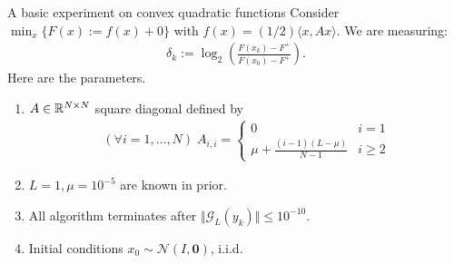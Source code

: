 \documentclass[11pt]{beamer}
\theoremstyle{definition}
\begin{document}
    \begin{frame}{A basic experiment on convex quadratic functions}
        Consider $\min_{x}\{F(x) := f(x) + 0\}$ with $f(x) = (1/2)\langle x, Ax\rangle$. 
        We are measuring: 
        \begin{align*}
            \delta_k := \log_2\left(
                \frac{F(x_k) - F^+}{F(x_0) - F^+}\right).  
        \end{align*}
        Here are the parameters. 
        \begin{enumerate}
            \item $A \in \mathbb R^{N \times N}$ square diagonal defined by 
            \begin{align*}
                (\forall i = 1, \ldots, N)\; A_{i, i} = \begin{cases}
                    0 & i = 1
                    \\
                    \mu + \frac{(i - 1)(L - \mu)}{N - 1} & i \ge 2
                \end{cases}
            \end{align*}
            \item $L = 1, \mu = 10^{-5}$ are known in prior. 
            \item All algorithm terminates after $\Vert \mathcal G_L(y_k) \Vert \le 10^{-10}$. 
            \item Initial conditions $x_0 \sim \mathcal N(I, \mathbf 0)$, i.i.d. 
        \end{enumerate}
    \end{frame}
\end{document}
